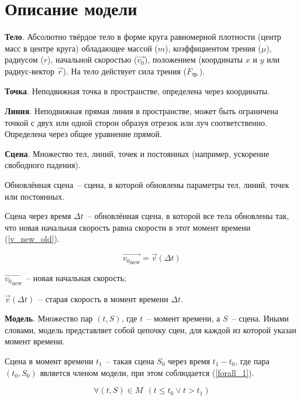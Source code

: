 \section{Описание модели}\label{model_1_3}

\textbf{Тело}. Абсолютно твёрдое тело в форме круга равномерной плотности
(центр масс в центре круга) обладающее массой (\(m\)), коэффициентом трения (\(\mu\)),
радиусом (\(r\)), начальной скоростью (\(\vec{v_0}\)), положением (координаты \(x\) и \(y\) или радиус-вектор \(\vec{r}\)).
На тело действует сила трения (\(F_\text{тр.}\)).

\textbf{Точка}. Неподвижная точка в пространстве, определена через координаты.

\textbf{Линия}. Неподвижная прямая линия в пространстве, может быть ограничена точкой с двух или
одной сторон образуя отрезок или луч соответственно. Определена через общее уравнение прямой.

\textbf{Сцена}. Множество тел, линий, точек и постоянных (например, ускорение свободного падения).

Обновлённая сцена~-- сцена, в которой обновлены параметры тел, линий, точек или постоянных.

Сцена через время \(\Delta t\)~-- обновлённая сцена, в которой все тела обновлены так,
что новая начальная скорость равна скорости в этот момент времени (\ref{v_new_old}).

\begin{equation}\label{v_new_old}
  \vec{{v_0}_\text{new}} = \vec{v}(\Delta t)
\end{equation}

\begin{Underequation}
  \(\vec{{v_0}_\text{new}}\)~-- новая начальная скорость;

  \(\vec{v}(\Delta t)\)~-- старая скорость в момент времени \(\Delta t\).
\end{Underequation}

\textbf{Модель}. Множество пар \((t, S)\), где \(t\)~-- момент времени, а \(S\)~-- сцена.
Иными словами, модель представляет собой цепочку сцен, для каждой из которой указан момент времени.

Сцена в момент времени \(t_1\)~-- такая сцена \(S_0\) через время \(t_1 - t_0\),
где пара \((t_0, S_0)\) является членом модели, при этом соблюдается (\ref{forall_1}).

\begin{equation}\label{forall_1}
  \forall (t, S) \in M~~(t \leqslant  t_0 \vee t > t_1)
\end{equation}

